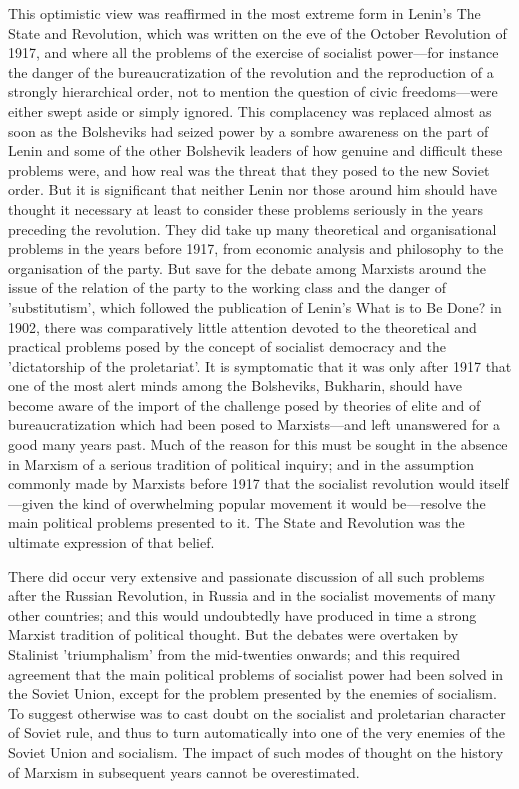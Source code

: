 This optimistic view was reaffirmed in the most extreme form in Lenin's The State and Revolution, which was written on the eve of the October Revolution of 1917, and where all the problems of the exercise of socialist power—for instance the danger of the bureaucratization of the revolution and the reproduction of a strongly hierarchical order, not to mention the question of civic freedoms—were either swept aside or simply ignored. This complacency was replaced almost as soon as the Bolsheviks had seized power by a sombre awareness on the part of Lenin and some of the other Bolshevik leaders of how genuine and difficult these problems were, and how real was the threat that they posed to the new Soviet order. But it is significant that neither Lenin nor those around him should have thought it necessary at least to consider these problems seriously in the years preceding the revolution. They did take up many theoretical and organisational problems in the years before 1917, from economic analysis and philosophy to the organisation of the party. But save for the debate among Marxists around the issue of the relation of the party to the working class and the danger of 'substitutism', which followed the publication of Lenin's What is to Be Done? in 1902, there was comparatively little attention devoted to the theoretical and practical problems posed by the concept of socialist democracy and the 'dictatorship of the proletariat'. It is symptomatic that it was only after 1917 that one of the most alert minds among the Bolsheviks, Bukharin, should have become aware of the import of the challenge posed by theories of elite and of bureaucratization which had been posed to Marxists—and left unanswered for a good many years past. Much of the reason for this must be sought in the absence in Marxism of a serious tradition of political inquiry; and in the assumption commonly made by Marxists before 1917 that the socialist revolution would itself—given the kind of overwhelming popular movement it would be—resolve the main political problems presented to it. The State and Revolution was the ultimate expression of that belief.

There did occur very extensive and passionate discussion of all such problems after the Russian Revolution, in Russia and in the socialist movements of many other countries; and this would undoubtedly have produced in time a strong Marxist tradition of political thought. But the debates were overtaken by Stalinist 'triumphalism' from the mid-twenties onwards; and this required agreement that the main political problems of socialist power had been solved in the Soviet Union, except for the problem presented by the enemies of socialism. To suggest otherwise was to cast doubt on the socialist and proletarian character of Soviet rule, and thus to turn automatically into one of the very enemies of the Soviet Union and socialism. The impact of such modes of thought on the history of Marxism in subsequent years cannot be overestimated.

